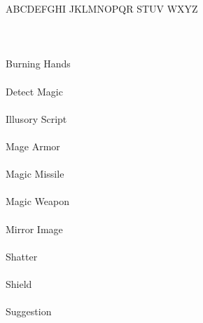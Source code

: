 \documentclass[letterpaper]{article}
\begin{document}
{
    \Large \wizpenfont \noindent %
    ABCDEFGHI \enspace JKLMNOPQR \enspace STUV \enspace WXYZ \\ \\
}
{
    \Large \noindent
     \\ \\
}
{
    \Large \wizpenfont \noindent %
    Burning \enspace Hands \\ \\
    Detect \enspace Magic \\ \\
    Illusory \enspace Script \\ \\
    Mage \enspace Armor \\ \\
    Magic \enspace Missile \\ \\
    Magic \enspace Weapon \\ \\
    Mirror \enspace Image \\ \\
    Shatter \\ \\
    Shield \\ \\
    Suggestion \\
}
\end{document}

